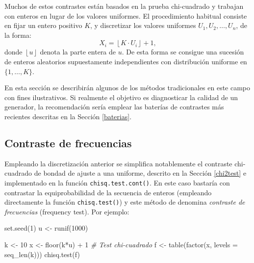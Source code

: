 \documentclass[
]{book}
\newenvironment{Shaded}{\begin{snugshade}}{\end{snugshade}}
\newcommand{\AttributeTok}[1]{\textcolor[rgb]{0.77,0.63,0.00}{#1}}
\newcommand{\CommentTok}[1]{\textcolor[rgb]{0.56,0.35,0.01}{\textit{#1}}}
\newcommand{\DecValTok}[1]{\textcolor[rgb]{0.00,0.00,0.81}{#1}}
\newcommand{\FunctionTok}[1]{\textcolor[rgb]{0.00,0.00,0.00}{#1}}
\newcommand{\NormalTok}[1]{#1}
\newcommand{\OtherTok}[1]{\textcolor[rgb]{0.56,0.35,0.01}{#1}}
\newcommand{\SpecialCharTok}[1]{\textcolor[rgb]{0.00,0.00,0.00}{#1}}
\theoremstyle{break}
\theoremstyle{definition}
\theoremstyle{definition}
\theoremstyle{definition}
\theoremstyle{definition}
\theoremstyle{remark}
\begin{document}
Muchos de estos contrastes están basados en la prueba chi-cuadrado y trabajan con enteros en lugar de los valores uniformes. El procedimiento habitual consiste en fijar un entero positivo \(K\), y discretizar los valores uniformes \(U_{1},U_{2},\ldots,U_{n}\), de la forma:
\[X_i = \left\lfloor K\cdot U_{i}\right\rfloor + 1 ,\]
donde \(\left\lfloor u\right\rfloor\) denota la parte entera de \(u\).
De esta forma se consigue una sucesión de enteros aleatorios supuestamente independientes con distribución uniforme en \(\{1, \ldots, K\}\).

En esta sección se describirán algunos de los métodos tradicionales en este campo con fines ilustrativos. Si realmente el objetivo es diagnosticar la calidad de un generador, la recomendación sería emplear las baterías de contrastes más recientes descritas en la Sección \ref{baterias}.

\hypertarget{contraste-de-frecuencias}{%
\subsection{Contraste de frecuencias}\label{contraste-de-frecuencias}}

Empleando la discretización anterior se simplifica notablemente el contraste chi-cuadrado de bondad de ajuste a una uniforme, descrito en la Sección \ref{chi2test} e implementado en la función \texttt{chisq.test.cont()}.
En este caso bastaría con contrastar la equiprobabilidad de la secuencia de enteros (empleando directamente la función \texttt{chisq.test()}) y este método de denomina \emph{contraste de frecuencias} (frequency test).
Por ejemplo:

\begin{Shaded}
\begin{Highlighting}[]
\FunctionTok{set.seed}\NormalTok{(}\DecValTok{1}\NormalTok{)}
\NormalTok{u }\OtherTok{\textless{}{-}} \FunctionTok{runif}\NormalTok{(}\DecValTok{1000}\NormalTok{)}

\NormalTok{k }\OtherTok{\textless{}{-}} \DecValTok{10}
\NormalTok{x }\OtherTok{\textless{}{-}} \FunctionTok{floor}\NormalTok{(k}\SpecialCharTok{*}\NormalTok{u) }\SpecialCharTok{+} \DecValTok{1}
\CommentTok{\# Test chi{-}cuadrado}
\NormalTok{f }\OtherTok{\textless{}{-}} \FunctionTok{table}\NormalTok{(}\FunctionTok{factor}\NormalTok{(x, }\AttributeTok{levels =} \FunctionTok{seq\_len}\NormalTok{(k)))}
\FunctionTok{chisq.test}\NormalTok{(f)}
\end{Highlighting}
\end{Shaded}
\end{document}
